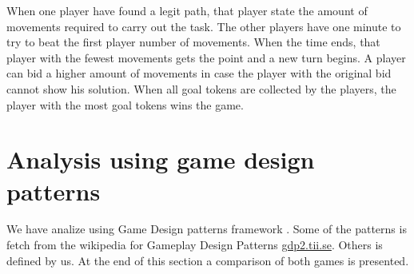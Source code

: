 \documentclass[a4paper]{article}
\begin{document}
When one player have found a legit path, that player state the amount of movements required to carry out the task.
The other players have one minute to try to beat the first player number of movements. When the time ends, that player with the fewest movements gets the point and a new turn begins.
A player can bid a higher amount of movements in case the player with the original bid cannot show his solution.
When all goal tokens are collected by the players, the player with the most goal tokens wins the game.

\section{Analysis using game design patterns}
We have analize using Game Design patterns framework \cite{Bjork2003}.
Some of the patterns is fetch from the wikipedia for Gameplay Design Patterns \url{gdp2.tii.se}.
Others is defined by us.
At the end of this section a comparison of both games is presented.

\newpage
\end{document}
